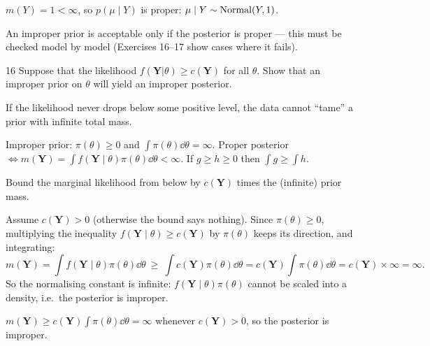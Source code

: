 \documentclass[11pt]{article}
\begin{document}
\begin{answer}
$m(Y)=1<\infty$, so $p(\mu\mid Y)$ is proper: $\mu\mid Y\sim\mathrm{Normal}(Y,1)$.
\end{answer}

\begin{takeaway}
An improper prior is acceptable only if the posterior is proper --- this must be checked model by model (Exercises 16--17 show cases where it fails).
\end{takeaway}


\begin{problem}{16}
Suppose that the likelihood $f(\mathbf Y|\theta)\ge c(\mathbf Y)$ for all $\theta$. Show that an improper prior on $\theta$ will yield an improper posterior.
\end{problem}

\begin{restate}
If the likelihood never drops below some positive level, the data cannot ``tame'' a prior with infinite total mass.
\end{restate}

\begin{recall}
Improper prior: $\pi(\theta)\ge0$ and $\int\pi(\theta)\dd\theta=\infty$. Proper posterior $\iff m(\mathbf Y)=\int f(\mathbf Y\mid\theta)\pi(\theta)\dd\theta<\infty$. If $g\ge h\ge0$ then $\int g\ge\int h$.
\end{recall}

\begin{keyidea}
Bound the marginal likelihood from below by $c(\mathbf Y)$ times the (infinite) prior mass.
\end{keyidea}

\solution
Assume $c(\mathbf Y)>0$ (otherwise the bound says nothing). Since $\pi(\theta)\ge0$, multiplying the inequality $f(\mathbf Y\mid\theta)\ge c(\mathbf Y)$ by $\pi(\theta)$ keeps its direction, and integrating:
\[
m(\mathbf Y)=\int f(\mathbf Y\mid\theta)\pi(\theta)\dd\theta\ \ge\ \int c(\mathbf Y)\pi(\theta)\dd\theta=c(\mathbf Y)\int\pi(\theta)\dd\theta=c(\mathbf Y)\times\infty=\infty.
\]
So the normalising constant is infinite: $f(\mathbf Y\mid\theta)\pi(\theta)$ cannot be scaled into a density, i.e.\ the posterior is improper.

\begin{answer}
$m(\mathbf Y)\ge c(\mathbf Y)\int\pi(\theta)\dd\theta=\infty$ whenever $c(\mathbf Y)>0$, so the posterior is improper.
\end{answer}
\end{document}
